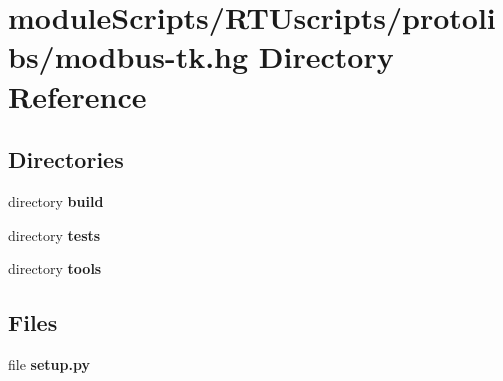 \section{module\+Scripts/\+R\+T\+Uscripts/protolibs/modbus-\/tk.hg Directory Reference}
\label{dir_50d8b070e5484214409ebb5bf5745985}
\subsection*{Directories}
\begin{DoxyCompactItemize}
\item 
directory {\bf build}
\item 
directory {\bf tests}
\item 
directory {\bf tools}
\end{DoxyCompactItemize}
\subsection*{Files}
\begin{DoxyCompactItemize}
\item 
file {\bf setup.\+py}
\end{DoxyCompactItemize}
